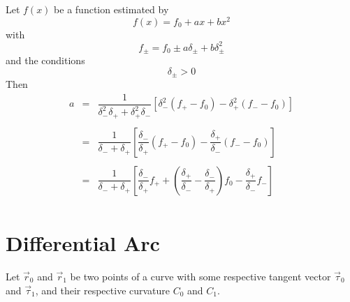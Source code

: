 \documentclass[11pt]{amsart}
\begin{document}
Let $f(x)$ be a function estimated by
\[
	f(x) = f_0 + ax + b x^2
\]
with
\[
	f_\pm = f_0 \pm a \delta_\pm + b \delta_\pm^2
\]
and the conditions
\[
	\delta_\pm > 0 %
\]
Then
\[
\begin{array}{rcl}
	a & = &
	\dfrac{1}{\delta_-^2\delta_+ + \delta_+^2\delta_-}
	\left[ 
	   \delta_-^2\left(f_+ - f_0 \right)
	 - \delta_+^2\left(f_- - f_0 \right)
	\right] \\
	\\
	& = & \dfrac{1}{\delta_- + \delta_+} 
	\left[
	 \dfrac{\delta_-}{\delta_+} \left(f_+ - f_0 \right)
	-\dfrac{\delta_+}{\delta_-} \left(f_- - f_0 \right)
	\right] \\
	\\
	& = & \dfrac{1}{\delta_- + \delta_+} 
	\left[
	\dfrac{\delta_-}{\delta_+} f_+
	+\left(\dfrac{\delta_+}{\delta_-} - \dfrac{\delta_-}{\delta_+}\right) f_0
	-\dfrac{\delta_+}{\delta_-} f_-
	\right]\\
\end{array}
\]

\section{Differential Arc}
Let $\vec{r}_0$ and $\vec{r}_1$ be two points of a curve
with some respective tangent vector $\vec{\tau}_0$ and $\vec{\tau}_1$, and their
respective curvature $C_0$ and $C_1$.
\end{document}
